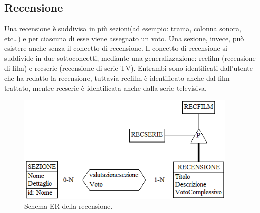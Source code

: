 \documentclass[a4paper,12pt]{report}
\begin{document}
	\subsection{Recensione}
	Una recensione è suddivisa in più sezioni(ad esempio: trama, colonna sonora, etc\dots) e per ciascuna di esse viene assegnato un voto. Una sezione, invece, può esistere anche senza il concetto di recensione. 
	Il concetto di recensione si suddivide in due sottoconcetti, mediante una generalizzazione: recfilm (recensione di film) e recserie (recensione di serie TV). Entrambi sono identificati dall'utente che ha redatto la recensione, tuttavia recfilm è identificato anche dal film trattato, mentre recserie è identificata anche dalla serie televisiva.
	\begin{figure}[H]
		\centering
		\includegraphics[width=300pt]{ER/recensione.png}
		\caption{Schema ER della recensione.}
	\end{figure}
\end{document}
